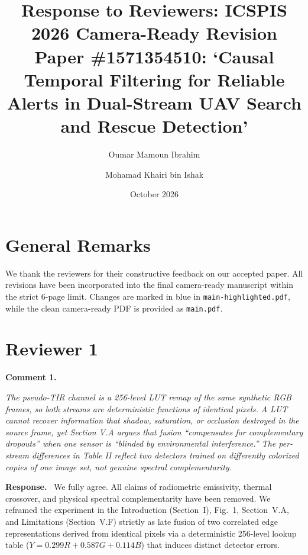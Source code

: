 \documentclass[10pt]{article}
\title{Response to Reviewers: ICSPIS 2026 Camera-Ready Revision\\
\normalsize Paper \#1571354510: `Causal Temporal Filtering for Reliable Alerts in Dual-Stream UAV Search and Rescue Detection'}
\author[1]{Oumar Mamoun Ibrahim}
\author[1]{Mohamad Khairi bin Ishak}
\affil[1]{Department of Computer Engineering, University of Sharjah, Sharjah, UAE}
\affil[ ]{\footnotesize Emails: \texttt{\{U22200741, mishak\}@sharjah.ac.ae}}
\date{October 2026}
\begin{document}
\maketitle
\small

\newcommand{\currev}{}
\newcommand{\reviewer}[1]{%
  \section*{Reviewer #1}%
  \renewcommand{\currev}{#1}%
  \setcounter{rcomment}{0}}
\newenvironment{rquote}{%
  \begin{list}{}{\setlength{\leftmargin}{1.5em}\setlength{\rightmargin}{1.5em}%
    \setlength{\topsep}{2pt}\setlength{\partopsep}{0pt}\setlength{\parsep}{0pt}}%
  \item[]\itshape}{\end{list}}
\newcommand{\rcomment}[1]{%
  \stepcounter{rcomment}%
  \par\needspace{4\baselineskip}\addvspace{0.6em}%
  \noindent\textbf{Comment \currev.\thercomment}%
  \begin{rquote}#1\end{rquote}%
  \noindent\textbf{Response.}\ }

\section*{General Remarks}

We thank the reviewers for their constructive feedback on our accepted paper. All revisions have been incorporated into the final camera-ready manuscript within the strict 6-page limit. Changes are marked in {\color{blue}blue} in \texttt{main-highlighted.pdf}, while the clean camera-ready PDF is provided as \texttt{main.pdf}.

\reviewer{1}

\rcomment{The pseudo-TIR channel is a 256-level LUT remap of the same synthetic RGB frames, so both streams are deterministic functions of identical pixels. A LUT cannot recover information that shadow, saturation, or occlusion destroyed in the source frame, yet Section V.A argues that fusion ``compensates for complementary dropouts'' when one sensor is ``blinded by environmental interference.'' The per-stream differences in Table II reflect two detectors trained on differently colorized copies of one image set, not genuine spectral complementarity.}
We fully agree. All claims of radiometric emissivity, thermal crossover, and physical spectral complementarity have been removed. We reframed the experiment in the Introduction (Section~I), Fig.~1, Section~V.A, and Limitations (Section~V.F) strictly as late fusion of two correlated edge representations derived from identical pixels via a deterministic 256-level lookup table ($Y = 0.299R + 0.587G + 0.114B$) that induces distinct detector errors.
\end{document}
